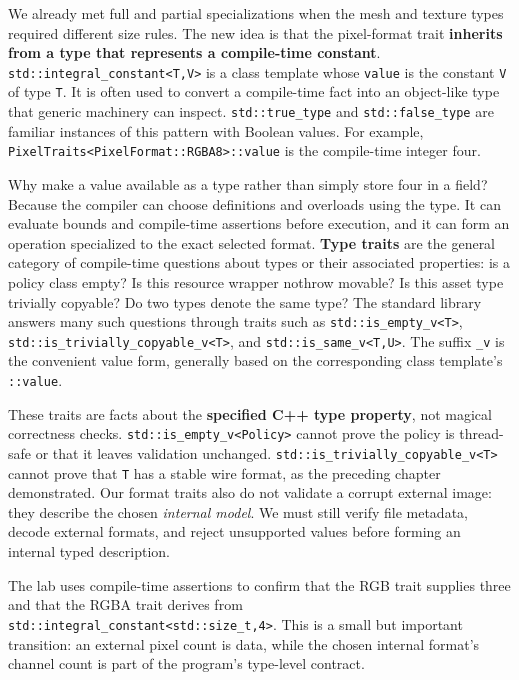 We already met full and partial specializations when the mesh and texture types required different size rules. The new idea is that the pixel-format trait \textbf{inherits from a type that represents a compile-time constant}. \texttt{std::integral\_constant\textless{}T,V\textgreater{}} is a class template whose \texttt{value} is the constant \texttt{V} of type \texttt{T}. It is often used to convert a compile-time fact into an object-like type that generic machinery can inspect. \texttt{std::true\_type} and \texttt{std::false\_type} are familiar instances of this pattern with Boolean values. For example, \texttt{PixelTraits\textless{}PixelFormat::RGBA8\textgreater{}::value} is the compile-time integer four.

Why make a value available as a type rather than simply store four in a field? Because the compiler can choose definitions and overloads using the type. It can evaluate bounds and compile-time assertions before execution, and it can form an operation specialized to the exact selected format. \textbf{Type traits} are the general category of compile-time questions about types or their associated properties: is a policy class empty? Is this resource wrapper nothrow movable? Is this asset type trivially copyable? Do two types denote the same type? The standard library answers many such questions through traits such as \texttt{std::is\_empty\_v\textless{}T\textgreater{}}, \texttt{std::is\_trivially\_copyable\_v\textless{}T\textgreater{}}, and \texttt{std::is\_same\_v\textless{}T,U\textgreater{}}. The suffix \texttt{\_v} is the convenient value form, generally based on the corresponding class template's \texttt{::value}.

These traits are facts about the \textbf{specified C++ type property}, not magical correctness checks. \texttt{std::is\_empty\_v\textless{}Policy\textgreater{}} cannot prove the policy is thread-safe or that it leaves validation unchanged. \texttt{std::is\_trivially\_copyable\_v\textless{}T\textgreater{}} cannot prove that \texttt{T} has a stable wire format, as the preceding chapter demonstrated. Our format traits also do not validate a corrupt external image: they describe the chosen \emph{internal model}. We must still verify file metadata, decode external formats, and reject unsupported values before forming an internal typed description.

The lab uses compile-time assertions to confirm that the RGB trait supplies three and that the RGBA trait derives from \texttt{std::integral\_constant\textless{}std::size\_t,4\textgreater{}}. This is a small but important transition: an external pixel count is data, while the chosen internal format's channel count is part of the program's type-level contract.

